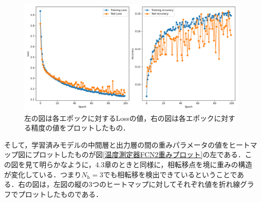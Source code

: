 \documentclass[a4paper,11pt]{jsreport}
\begin{document}
\begin{figure}[H]
  \begin{center}
      \includegraphics[width=\linewidth]{image/温度測定器2_L16_FCN_Nh3_loss.png}
      \caption{左の図は各エポックに対するLossの値，右の図は各エポックに対する精度の値をプロットしたもの．}
      \label{温度測定器FCN2lossと精度}
  \end{center}
\end{figure}

そして，学習済みモデルの中間層と出力層の間の重みパラメータの値をヒートマップ図にプロットしたものが図\ref{温度測定器FCN2重みプロット}の左である．この図を見て明らかなように，4.3章のときと同様に，相転移点を境に重みの構造が変化している．つまり$N_{\text{h}}=3$でも相転移を検出できているということである．右の図は，左図の縦の3つのヒートマップに対してそれぞれ値を折れ線グラフでプロットしたものである．\par
\end{document}
